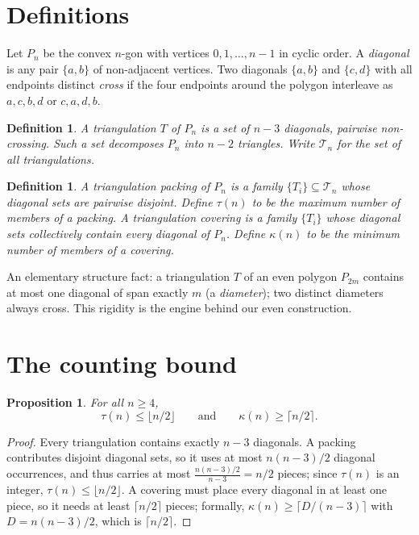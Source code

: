 \documentclass[11pt,a4paper]{article}
\newtheorem{proposition}[theorem]{Proposition}
\newtheorem{definition}[theorem]{Definition}
\begin{document}
\section{Definitions}

Let $P_n$ be the convex $n$-gon with vertices $0,1,\ldots,n-1$ in cyclic order.
A \emph{diagonal} is any pair $\{a,b\}$ of non-adjacent vertices. Two diagonals
$\{a,b\}$ and $\{c,d\}$ with all endpoints distinct \emph{cross} if the four
endpoints around the polygon interleave as $a,c,b,d$ or $c,a,d,b$.

\begin{definition}
A \emph{triangulation} $T$ of $P_n$ is a set of $n-3$ diagonals, pairwise
non-crossing. Such a set decomposes $P_n$ into $n-2$ triangles. Write
$\mathcal T_n$ for the set of all triangulations.
\end{definition}

\begin{definition}
A \emph{triangulation packing} of $P_n$ is a family $\{T_i\}\subseteq \mathcal T_n$
whose diagonal sets are pairwise disjoint. Define $\tau(n)$ to be the maximum
number of members of a packing. A \emph{triangulation covering} is a family
$\{T_i\}$ whose diagonal sets collectively contain every diagonal of $P_n$.
Define $\kappa(n)$ to be the minimum number of members of a covering.
\end{definition}

An elementary structure fact: a triangulation $T$ of an even polygon $P_{2m}$
contains at most one diagonal of span exactly $m$ (a \emph{diameter}); two
distinct diameters always cross. This rigidity is the engine behind our even
construction.

\section{The counting bound}

\begin{proposition}
For all $n \ge 4$,
\[
\tau(n) \le \lfloor n/2 \rfloor
\qquad\text{and}\qquad
\kappa(n) \ge \lceil n/2 \rceil.
\]
\end{proposition}

\begin{proof}
Every triangulation contains exactly $n-3$ diagonals. A packing contributes
disjoint diagonal sets, so it uses at most $n(n-3)/2$ diagonal occurrences, and
thus carries at most $\frac{n(n-3)/2}{n-3} = n/2$ pieces; since $\tau(n)$ is an
integer, $\tau(n) \le \lfloor n/2 \rfloor$.  A covering must place every
diagonal in at least one piece, so it needs at least $\lceil n/2\rceil$ pieces;
formally, $\kappa(n) \ge \lceil D/(n-3) \rceil$ with $D = n(n-3)/2$, which is
$\lceil n/2 \rceil$. \qedhere
\end{proof}
\end{document}

